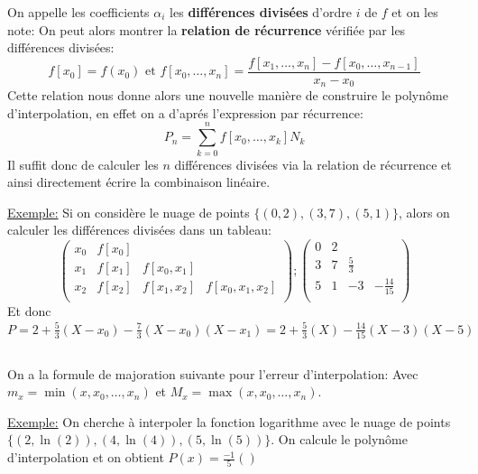 On appelle les coefficients \(\alpha_i\) les \textbf{différences divisées} d'ordre \(i\) de \(f\) et on les note:
On peut alors montrer la \textbf{relation de récurrence} vérifiée par les différences divisées:
\[
   f[x_0] = f(x_0) \text{ et } f[x_0, \ldots, x_n] = \frac{f[x_1, \ldots, x_n] - f[x_0, \ldots, x_{n-1}]}{x_n-x_0}   
\]
Cette relation nous donne alors une nouvelle manière de construire le polynôme d'interpolation, en effet on a d'aprés l'expression par récurrence:
\[
   P_n = \sum_{k=0}^{n} f[x_0, \ldots, x_k] N_k   
\]
Il suffit donc de calculer les \(n\) différences divisées via la relation de récurrence et ainsi directement écrire la combinaison linéaire.\<

\underline{Exemple:} Si on considère le nuage de points \(\{(0, 2), (3, 7), (5, 1)\}\), alors on calculer les différences divisées dans un tableau:
\[
   \left(\begin{array}{cccc}
      x_0 & f[x_0] &  & \\ 
      x_1 & f[x_1] & f[x_0, x_1] &\\
      x_2 & f[x_2] & f[x_1, x_2] & f[x_0, x_1, x_2]\\ 
   \end{array}\right)  ; 
   \left(\begin{array}{cccc}
      0 & 2 &  & \\ 
      3 & 7 & \frac{5}{3} &\\
      5 & 1 & -3 & -\frac{14}{15}\\ 
   \end{array}\right)
\] 
Et donc \(P = 2 + \frac{5}{3}(X - x_0) -  \frac{7}{3}(X - x_0)(X - x_1) = 2 + \frac{5}{3}(X) -  \frac{14}{15}(X - 3)(X - 5)\)
\subsection*{}
On a la formule de majoration suivante pour l'erreur d'interpolation:
Avec \(m_x = \min(x, x_0, \ldots, x_n)\) et \(M_x = \max(x, x_0, \ldots, x_n)\).\<

\underline{Exemple:} On cherche à interpoler la fonction logarithme avec le nuage de points \(\{(2, \ln(2)), (4, \ln(4)), (5, \ln(5))\}\). 
On calcule le polynôme d'interpolation et on obtient \(P(x) = \frac{-1}{5}()\)

